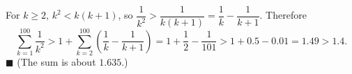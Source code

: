For $k\ge2$, $k^2<k(k+1)$, so $\dfrac{1}{k^2}>\dfrac{1}{k(k+1)}=\dfrac{1}{k}-\dfrac{1}{k+1}$. Therefore
\[
\sum_{k=1}^{100}\dfrac{1}{k^2}>1+\sum_{k=2}^{100}\left(\dfrac{1}{k}-\dfrac{1}{k+1}\right)=1+\dfrac{1}{2}-\dfrac{1}{101}>1+0.5-0.01=1.49>1.4 .
\]
$\blacksquare$ (The sum is about $1.635$.)
